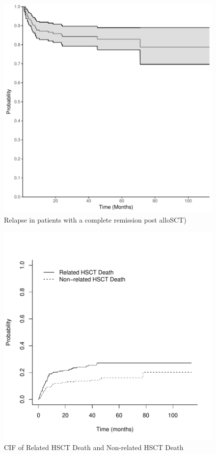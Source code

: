 \documentclass[a4paper,11pt] {article}
\begin{document}
\begin{figure}
\begin{center}
\includegraphics{Rapport-fig4}
\end{center}
\caption{Relapse in patients with a complete remission post alloSCT)}
\label{fig4}
\end{figure}


\begin{figure}
\begin{center}
\includegraphics{Rapport-fig5}
\end{center}
\caption{CIF of Related HSCT Death and Non-related HSCT Death}
\label{fig5}
\end{figure}
\end{document}
